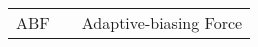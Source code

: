 \label{cha:symbols}

\begin{longtable}[l]{lcp{10cm}}
	ABF		&&  Adaptive-biasing Force \\
\end{longtable}
